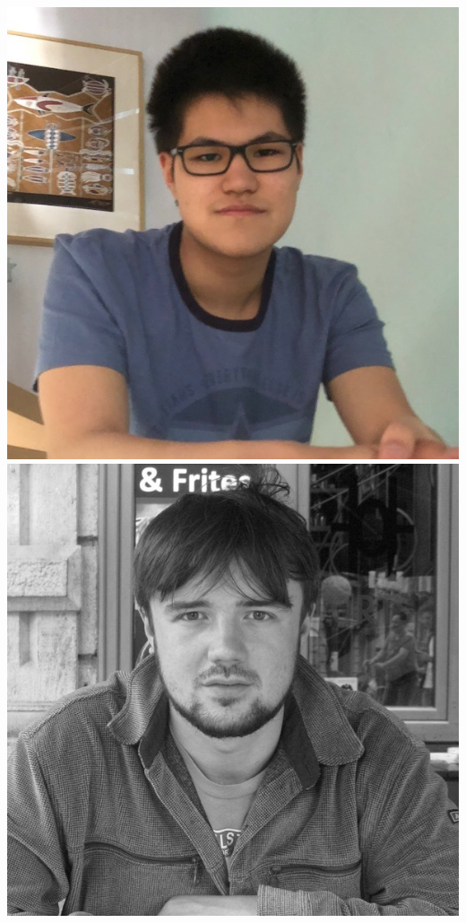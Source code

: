 \documentclass[aspectratio=169]{beamer}
\begin{document}
\begin{frame}
{        \includegraphics[width=0.09\textheight]{people/namu_kroupa.jpg}%
        \includegraphics[width=0.09\textheight]{people/sam_leeney.jpg}%
}
\end{frame}
\end{document}
